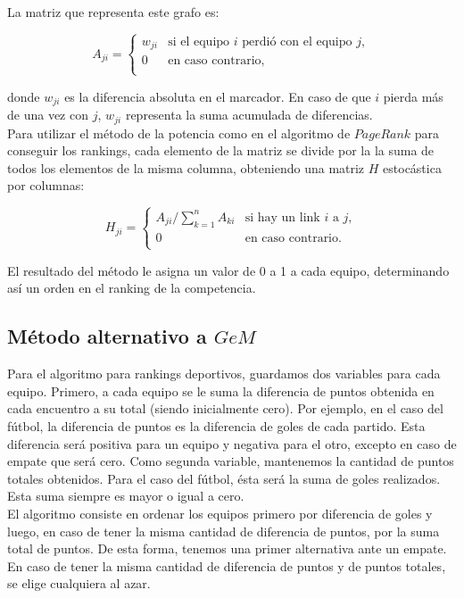 La matriz que representa este grafo es:

\begin{equation*}
A_{ji} = \left\{
  \begin{array}{cl}
  w_{ji} & \text{si el equipo } i \text{ perdi\'o con el equipo } j,\\
  0 & \text{en caso contrario, }\\
  \end{array} \right.
\end{equation*}

\noindent donde $w_{ji}$ es la diferencia absoluta en el marcador. En caso de que $i$ pierda m\'as de una vez con $j$, $w_{ji}$ representa la suma
acumulada de diferencias. \\

Para utilizar el método de la potencia como en el algoritmo de $PageRank$ para conseguir los rankings, cada elemento de la matriz se divide por la la suma de todos los elementos de la misma columna, obteniendo una matriz $H$ estocástica por columnas:

\begin{equation*}
H_{ji} = \left\{
  \begin{array}{cl}
  A_{ji}/\sum_{k = 1}^n A_{ki} & \text{si hay un link } i \text{ a } j,\\
  0 & \text{en caso contrario.}\\
  \end{array} \right.
\end{equation*}

El resultado del método le asigna un valor de 0 a 1 a cada equipo, determinando así un orden en el ranking de la competencia.

\subsection{Método alternativo a $GeM$}

Para el algoritmo para rankings deportivos, guardamos dos variables para cada equipo. Primero, a cada equipo se le suma la diferencia de puntos obtenida en cada encuentro a su total (siendo inicialmente cero). Por ejemplo, en el caso del fútbol, la diferencia de puntos es la diferencia de goles de cada partido. Esta diferencia será positiva para un equipo y negativa para el otro, excepto en caso de empate que será cero. Como segunda variable, mantenemos la cantidad de puntos totales obtenidos. Para el caso del fútbol, ésta será la suma de goles realizados. Esta suma siempre es mayor o igual a cero. \\

El algoritmo consiste en ordenar los equipos primero por diferencia de goles y luego, en caso de tener la misma cantidad de diferencia de puntos, por la suma total de puntos. De esta forma, tenemos una primer alternativa ante un empate. En caso de tener la misma cantidad de diferencia de puntos y de puntos totales, se elige cualquiera al azar.\\


